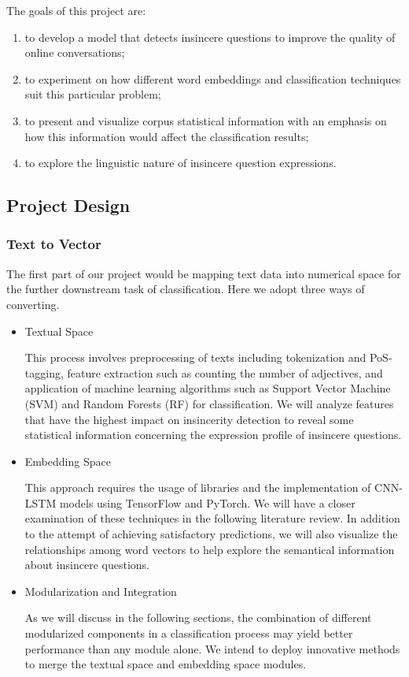 \documentclass[12pt]{diazessay} %
\begin{document}
The goals of this project are: 
\begin{enumerate}
\item to develop a model that detects insincere questions to improve the quality of online conversations; 
\item to experiment on how different word embeddings and classification techniques suit this particular problem; 
\item to present and visualize corpus statistical information with an emphasis on how this information would affect the classification results; 
\item to explore the linguistic nature of insincere question expressions. 
\end{enumerate}

\subsection{Project Design}

\subsubsection{Text to Vector}

The first part of our project would be mapping text data into numerical space for the further downstream task of classification. Here we adopt three ways of converting.

\begin{itemize}
	\item Textual Space

This process involves preprocessing of texts including tokenization and PoS-tagging, feature extraction such as counting the number of adjectives, and application of machine learning algorithms such as Support Vector Machine (SVM) and Random Forests (RF) for classification. We will analyze features that have the highest impact on insincerity detection to reveal some statistical information concerning the expression profile of insincere questions. 

	\item Embedding Space

This approach requires the usage of libraries and the implementation of CNN-LSTM models using TensorFlow and PyTorch. We will have a closer examination of these techniques in the following literature review. In addition to the attempt of achieving satisfactory predictions, we will also visualize the relationships among word vectors to help explore the semantical information about insincere questions.

	\item Modularization and Integration

As we will discuss in the following sections, the combination of different modularized components in a classification process may yield better performance than any module alone. We intend to deploy innovative methods to merge the textual space and embedding space modules. 	
\end{itemize}
\end{document}
